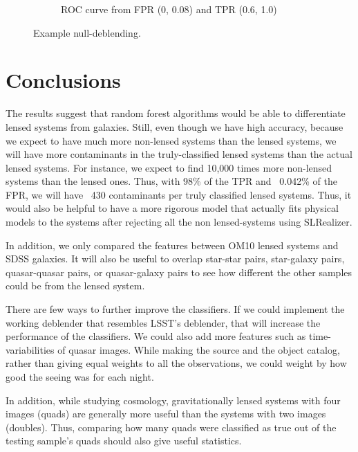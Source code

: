 \documentclass[\docopts]{\docclass}
\begin{document}
\begin{figure}
\begin{subfigure}[bt]{0.48\linewidth}
        \caption{ROC curve from FPR (0, 0.08) and TPR (0.6, 1.0)}
         \label{fig:ML Magnified}
    \end{subfigure}
    \caption{Example null-deblending.}
    \label{fig:null-deblend}
\end{figure}


\section{Conclusions}
\label{sec:conclusions}

The results suggest that random forest algorithms would be able to differentiate lensed systems from galaxies. Still, even though we have high accuracy, because we expect to have much more non-lensed systems than the lensed systems, we will have more contaminants in the truly-classified lensed systems than the actual lensed systems. For instance, we expect to find 10,000 times more non-lensed systems than the lensed ones. Thus, with 98\% of the TPR and ~0.042\% of the FPR, we will have ~430 contaminants per truly classified lensed systems. Thus, it would also be helpful to have a more rigorous model that actually fits physical models to the systems after rejecting all the non lensed-systems using SLRealizer.

In addition, we only compared the features between OM10 lensed systems and SDSS galaxies. It will also be useful to overlap star-star pairs, star-galaxy pairs, quasar-quasar pairs, or quasar-galaxy pairs to see how different the other samples could be from the lensed system.

There are few ways to further improve the classifiers. If we could implement the working deblender that resembles LSST’s deblender, that will increase the performance of the classifiers. We could also add more features such as time-variabilities of quasar images. While making the source and the object catalog, rather than giving equal weights to all the observations, we could weight by how good the seeing was for each night.

In addition, while studying cosmology, gravitationally lensed systems with four images (quads) are generally more useful than the systems with two images (doubles). Thus, comparing how many quads were classified as true out of the testing sample’s quads should also give useful statistics.
\end{document}
